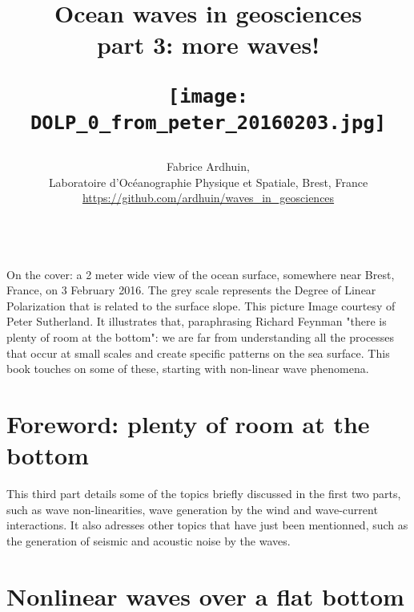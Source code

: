 \documentclass[a4paper]{book}  %
\begin{document}
\title{{\Huge Ocean waves in geosciences }
{\Large \\  part 3: more waves!}
 \vspace{0.1cm}\\
   \centerline{\texttt{[image: DOLP\_0\_from\_peter\_20160203.jpg]}}}
\author{Fabrice Ardhuin, \\
Laboratoire d'Oc{\'e}anographie Physique et Spatiale, Brest,
France \\
 \url{https://github.com/ardhuin/waves_in_geosciences} \\
\vspace{1.5cm}\\
} \maketitle
\clearpage
On the cover: a 2 meter wide view of the ocean surface, somewhere near Brest, France, on 3 February 2016. The grey scale represents the Degree of Linear Polarization that is related to the surface slope. This picture Image courtesy of Peter Sutherland. It illustrates that, paraphrasing Richard Feynman  "there is plenty of room at the bottom": we are far from understanding all the processes that occur at small scales and create specific patterns on the sea surface. This book touches on some of these, starting with non-linear wave phenomena. 
 \cleardoublepage
{}

\setcounter{page}{3}

\tableofcontents
\cleardoublepage


\setcounter{chapter}{0}

\chapter*{Foreword: plenty of room at the bottom}\label{foreword2}
This third part details some of the topics briefly discussed in the first two parts, 
such as wave non-linearities, wave generation by the wind
and wave-current interactions. It also adresses other topics that have just been mentionned, such as the generation of 
seismic and acoustic noise by the waves.  
\cleardoublepage
\chapter{Nonlinear waves over a flat bottom}\label{ch_nonlin}
 
\cleardoublepage
\end{document}
